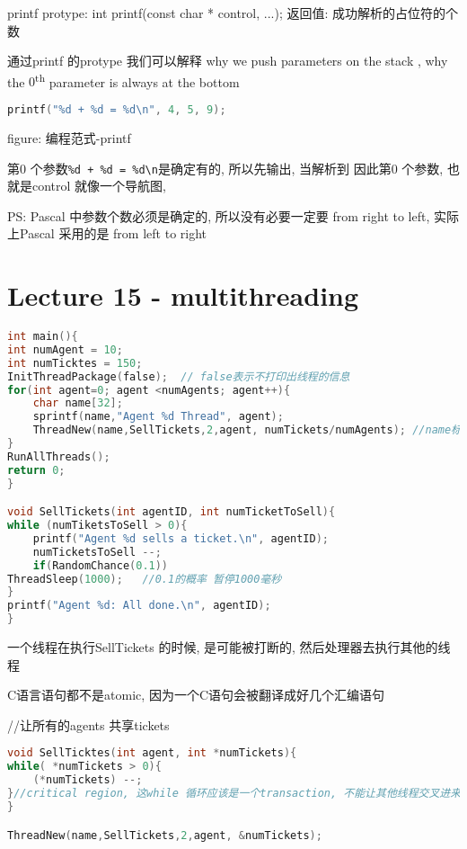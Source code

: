 \documentclass{article}
\begin{document}
printf
protype:	int printf(const char * control, ...);
返回值: 成功解析的占位符的个数

通过printf 的protype 我们可以解释
why we push parameters on the stack , why the $0$\textsuperscript{th} parameter is always at the bottom

\begin{lstlisting}[language = C]
printf("%d + %d = %d\n", 4, 5, 9);
\end{lstlisting}
figure: 编程范式-printf
 
第0 个参数\verb "%d + %
因此第0 个参数, 也就是control 就像一个导航图,

PS: Pascal 中参数个数必须是确定的, 所以没有必要一定要 from right to left, 实际上Pascal 采用的是 from left to right

\section{Lecture 15 - multithreading}
\begin{lstlisting}[language = C]
int main(){
int numAgent = 10;
int numTicktes = 150;
InitThreadPackage(false);  // false表示不打印出线程的信息
for(int agent=0; agent <numAgents; agent++){
	char name[32];
	sprintf(name,"Agent %d Thread", agent);
	ThreadNew(name,SellTickets,2,agent, numTickets/numAgents); //name标记不同的线程
}
RunAllThreads();
return 0;
}

void SellTickets(int agentID, int numTicketToSell){
while (numTiketsToSell > 0){
	printf("Agent %d sells a ticket.\n", agentID);
	numTicketsToSell --;
	if(RandomChance(0.1)) 
ThreadSleep(1000);	 //0.1的概率 暂停1000毫秒
}
printf("Agent %d: All done.\n", agentID);
}
\end{lstlisting}
一个线程在执行SellTickets 的时候, 是可能被打断的, 然后处理器去执行其他的线程

C语言语句都不是atomic, 因为一个C语句会被翻译成好几个汇编语句

//让所有的agents 共享tickets
\begin{lstlisting}[language = C]
void SellTicktes(int agent, int *numTickets){
while( *numTickets > 0){
	(*numTickets) --;
}//critical region, 这while 循环应该是一个transaction, 不能让其他线程交叉进来
}

ThreadNew(name,SellTickets,2,agent, &numTickets);
\end{lstlisting}
\end{document}
